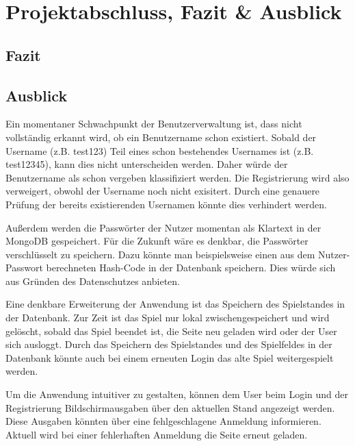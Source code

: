 
\chapter{Projektabschluss, Fazit \& Ausblick}\label{cha:Schlussbetrachtung}
\section{Fazit}\label{sec:Fazit}

\section{Ausblick}\label{sec:Ausblick}
Ein momentaner Schwachpunkt der Benutzerverwaltung ist, dass nicht vollständig erkannt wird, ob ein Benutzername schon existiert. Sobald der Username (z.B. test123) Teil eines schon bestehendes Usernames ist (z.B. test12345), kann dies nicht unterscheiden werden. Daher würde der Benutzername als schon vergeben klassifiziert werden. Die Registrierung wird also verweigert, obwohl der Username noch nicht exisitert. Durch eine genauere Prüfung der bereits existierenden Usernamen könnte dies verhindert werden.

Außerdem werden die Passwörter der Nutzer momentan als Klartext in der MongoDB gespeichert. Für die Zukunft wäre es denkbar, die Passwörter verschlüsselt zu speichern. Dazu könnte man beispielsweise einen aus dem Nutzer-Passwort berechneten Hash-Code in der Datenbank speichern. Dies würde sich aus Gründen des Datenschutzes anbieten.

Eine denkbare Erweiterung der Anwendung ist das Speichern des Spielstandes in der Datenbank. Zur Zeit ist das Spiel nur lokal zwischengespeichert und wird gelöscht, sobald das Spiel beendet ist, die Seite neu geladen wird oder der User sich ausloggt. Durch das Speichern des Spielstandes und des Spielfeldes in der Datenbank könnte auch bei einem erneuten Login das alte Spiel weitergespielt werden.

Um die Anwendung intuitiver zu gestalten, können dem User beim Login und der Registrierung Bildschirmausgaben über den aktuellen Stand angezeigt werden. Diese Ausgaben könnten über eine fehlgeschlagene Anmeldung informieren. Aktuell wird bei einer fehlerhaften Anmeldung die Seite erneut geladen. 